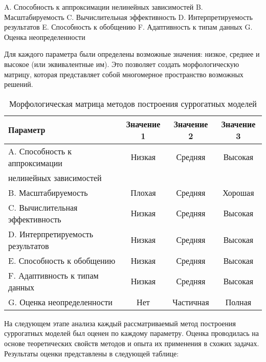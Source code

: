 A. Способность к аппроксимации нелинейных зависимостей
B. Масштабируемость
C. Вычислительная эффективность
D. Интерпретируемость результатов
E. Способность к обобщению
F. Адаптивность к типам данных
G. Оценка неопределенности

Для каждого параметра были определены возможные значения:
низкое, среднее и высокое (или эквивалентные им).
Это позволяет создать морфологическую матрицу,
которая представляет собой многомерное пространство возможных решений.

\begin{table}[h]
    \centering
    \caption{Морфологическая матрица методов построения суррогатных моделей}
    \begin{tabular}{lccc}
        \midrule
        Параметр                          & Значение 1 & Значение 2 & Значение 3 \\
        \midrule
        A. Способность к аппроксимации    & Низкая     & Средняя    & Высокая    \\
        нелинейных зависимостей           &            &            &            \\

        B. Масштабируемость               & Плохая     & Средняя    & Хорошая    \\
        C. Вычислительная эффективность   & Низкая     & Средняя    & Высокая    \\
        D. Интерпретируемость результатов & Низкая     & Средняя    & Высокая    \\
        E. Способность к обобщению        & Низкая     & Средняя    & Высокая    \\
        F. Адаптивность к типам данных    & Низкая     & Средняя    & Высокая    \\
        G. Оценка неопределенности        & Нет        & Частичная  & Полная     \\
        \midrule
    \end{tabular}
    \label{tab:morphological_matrix}
\end{table}

На следующем этапе анализа каждый рассматриваемый метод
построения суррогатных моделей был оценен по каждому параметру.
Оценка проводилась на основе теоретических свойств методов и опыта
их применения в схожих задачах. Результаты оценки представлены в следующей таблице:

